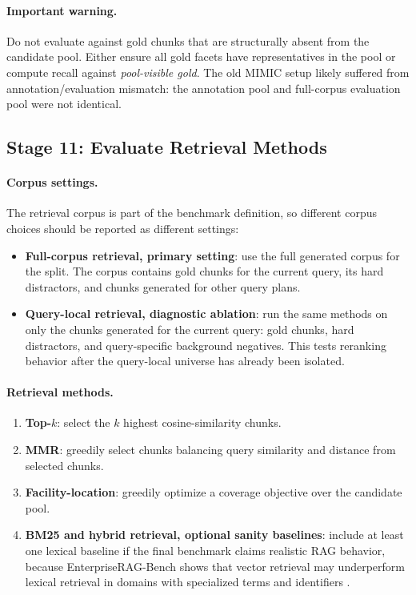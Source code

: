 \documentclass[11pt,a4paper]{article}
\newcommand{\stage}[2]{\subsection{\textcolor{betterblue}{#1}: #2}}
\begin{document}
\paragraph{Important warning.}
Do not evaluate against gold chunks that are structurally absent from the candidate pool. Either ensure all gold facets have representatives in the pool or compute recall against \emph{pool-visible gold}. The old MIMIC setup likely suffered from annotation/evaluation mismatch: the annotation pool and full-corpus evaluation pool were not identical.

\stage{Stage 11}{Evaluate Retrieval Methods}

\paragraph{Corpus settings.}
The retrieval corpus is part of the benchmark definition, so different corpus choices should be reported as different settings:

\begin{itemize}[leftmargin=*]
	\item \textbf{Full-corpus retrieval, primary setting}: use the full generated corpus for the split. The corpus contains gold chunks for the current query, its hard distractors, and chunks generated for other query plans.
	\item \textbf{Query-local retrieval, diagnostic ablation}: run the same methods on only the chunks generated for the current query: gold chunks, hard distractors, and query-specific background negatives. This tests reranking behavior after the query-local universe has already been isolated.
\end{itemize}

\paragraph{Retrieval methods.}

\begin{enumerate}[leftmargin=*]
	\item \textbf{Top-$k$}: select the $k$ highest cosine-similarity chunks.
	\item \textbf{MMR}: greedily select chunks balancing query similarity and distance from selected chunks.
	\item \textbf{Facility-location}: greedily optimize a coverage objective over the candidate pool.
	\item \textbf{BM25 and hybrid retrieval, optional sanity baselines}: include at least one lexical baseline if the final benchmark claims realistic RAG behavior, because EnterpriseRAG-Bench shows that vector retrieval may underperform lexical retrieval in domains with specialized terms and identifiers \citep{sun2026enterpriseragbench}.
\end{enumerate}
\end{document}
